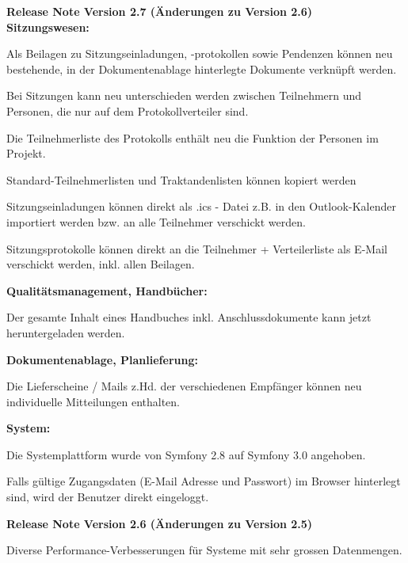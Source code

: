 \textbf{Release Note Version 2.7 (Änderungen zu Version 2.6)} \\
\textbf{Sitzungswesen:}
\begin{compactitem}
  \item Als Beilagen zu Sitzungseinladungen, -protokollen sowie Pendenzen können neu bestehende, in der Dokumentenablage hinterlegte Dokumente verknüpft werden.
	\item Bei Sitzungen kann neu unterschieden werden zwischen Teilnehmern und Personen, die nur auf dem Protokollverteiler sind.
	\item Die Teilnehmerliste des Protokolls enthält neu die Funktion der Personen im Projekt.
	\item Standard-Teilnehmerlisten und Traktandenlisten können kopiert werden
	\item Sitzungseinladungen können direkt als .ics - Datei z.B. in den Outlook-Kalender importiert werden bzw. an alle Teilnehmer verschickt werden.
	\item Sitzungsprotokolle können direkt an die Teilnehmer + Verteilerliste als E-Mail verschickt werden, inkl. allen Beilagen.
\end{compactitem}
\textbf{Qualitätsmanagement, Handbücher:}
\begin{compactitem}
  \item Der gesamte Inhalt eines Handbuches inkl. Anschlussdokumente kann jetzt heruntergeladen werden.
\end{compactitem}
\textbf{Dokumentenablage, Planlieferung:}
\begin{compactitem}
  \item Die Lieferscheine / Mails z.Hd. der verschiedenen Empfänger können neu individuelle Mitteilungen enthalten.
\end{compactitem}
\textbf{System:}
\begin{compactitem}
  \item Die Systemplattform wurde von Symfony 2.8 auf Symfony 3.0 angehoben.
	\item Falls gültige Zugangsdaten (E-Mail Adresse und Passwort) im Browser hinterlegt sind, wird der Benutzer direkt eingeloggt.
\end{compactitem}

\vspace{\baselineskip}
\textbf{Release Note Version 2.6 (Änderungen zu Version 2.5)} \\
\begin{compactitem}
  \item Diverse Performance-Verbesserungen für Systeme mit sehr grossen Datenmengen.
\end{compactitem}

